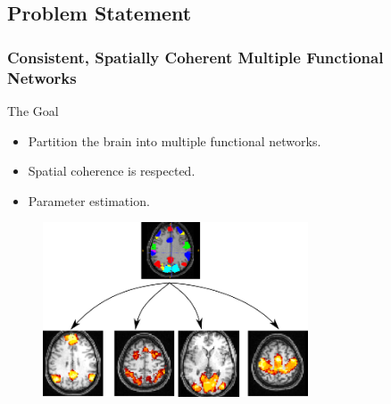 \documentclass[sansserif, 10pt]{beamer}
\begin{document}
\subsection{Problem Statement}
\begin{frame}
\frametitle{Consistent, Spatially Coherent Multiple Functional
  Networks~\cite{liu2011monteCopy} }
\begin{block}{The Goal}
  \begin{itemize}
  \item Partition the brain into multiple functional networks.
  \item Spatial coherence is respected.
  \item Parameter estimation.
  \end{itemize}
\end{block}
\vspace{10pt}
\begin{figure}
  \centering
  \includegraphics[width=0.7\textwidth]{sfig/myseg}
\end{figure}
\end{frame}
\end{document}
